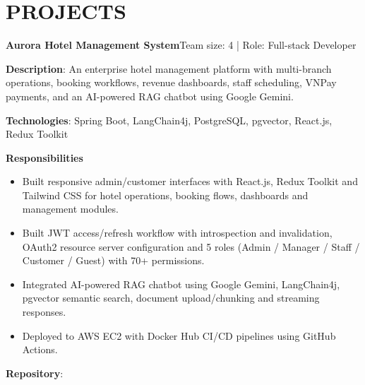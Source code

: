 \section{PROJECTS}
\resumeSubHeadingListStart
  \resumeProjectHeading
    {\textbf{Aurora Hotel Management System}}{Team size: 4 | Role: Full-stack Developer}
    \resumeItemListStart
      \item \textbf{Description}: An enterprise hotel management platform with multi-branch operations, booking workflows,
        revenue dashboards, staff scheduling, VNPay payments, and an AI-powered RAG chatbot using Google Gemini.
      \item \textbf{Technologies}: Spring Boot, LangChain4j, PostgreSQL, pgvector, React.js, Redux Toolkit
      \item \textbf{Responsibilities}
        \begin{itemize}
          \item Built responsive admin/customer interfaces with React.js, Redux Toolkit and Tailwind CSS for hotel operations, booking flows, dashboards and management modules.
          \item Built JWT access/refresh workflow with introspection and invalidation, OAuth2 resource server configuration and 5 roles (Admin / Manager / Staff / Customer / Guest) with 70+ permissions.
          \item Integrated AI-powered RAG chatbot using Google Gemini, LangChain4j, pgvector semantic search, document upload/chunking and streaming responses.
          \item Deployed to AWS EC2 with Docker Hub CI/CD pipelines using GitHub Actions.
        \end{itemize}
      \item \textbf{Repository}: \href{https://github.com/nvminh162/aurora-hotel-management-system}{}
    \resumeItemListEnd

